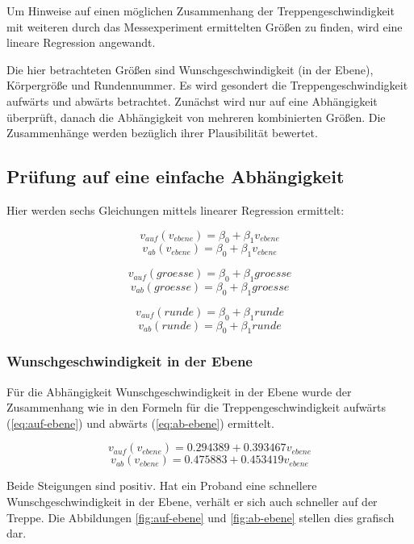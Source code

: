 
Um Hinweise auf einen möglichen Zusammenhang der Treppengeschwindigkeit mit weiteren durch das Messexperiment ermittelten Größen zu finden, wird eine lineare 
Regression angewandt.

Die hier betrachteten Größen sind Wunschgeschwindigkeit (in der Ebene),
Körpergröße und Rundennummer. Es wird gesondert die Treppengeschwindigkeit aufwärts und abwärts betrachtet.
Zunächst wird nur auf eine Abhängigkeit überprüft, danach die Abhängigkeit von mehreren kombinierten Größen. Die Zusammenhänge werden bezüglich ihrer Plausibilität bewertet.

\subsection{Prüfung auf eine einfache Abhängigkeit}

Hier werden sechs Gleichungen mittels linearer Regression ermittelt: 

\[v_{auf}(v_{ebene}) = \beta_0 + \beta_1 v_{ebene}\]
\[v_{ab}(v_{ebene}) = \beta_0 + \beta_1 v_{ebene}\]

\[v_{auf}(groesse) = \beta_0 + \beta_1 groesse\]
\[v_{ab}(groesse) = \beta_0 + \beta_1 groesse\]

\[v_{auf}(runde) = \beta_0 + \beta_1 runde\]
\[v_{ab}(runde) = \beta_0 + \beta_1 runde\]

\subsubsection{Wunschgeschwindigkeit in der Ebene}

Für die Abhängigkeit Wunschgeschwindigkeit in der Ebene wurde 
der Zusammenhang wie in den Formeln für die Treppengeschwindigkeit aufwärts (\ref{eq:auf-ebene}) und abwärts (\ref{eq:ab-ebene}) ermittelt. 

\begin{equation} \label{eq:auf-ebene}
	v_{auf}(v_{ebene}) = 0.294389 + 0.393467 v_{ebene}
\end{equation}
\begin{equation} \label{eq:ab-ebene}
	v_{ab}(v_{ebene}) = 0.475883 + 0.453419 v_{ebene}
\end{equation}

Beide Steigungen sind positiv. Hat ein Proband eine schnellere Wunschgeschwindigkeit in der Ebene, verhält er sich auch schneller auf 
der Treppe. Die Abbildungen \ref{fig:auf-ebene} und \ref{fig:ab-ebene}
stellen dies grafisch dar. 

